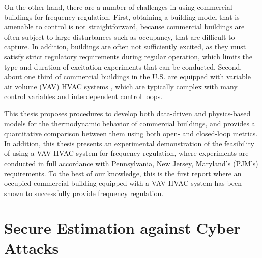 \documentclass[../thesis.tex]{subfiles}
\begin{document}
On the other hand, there are a number of challenges in using commercial buildings for frequency regulation. 
First, obtaining a building model that is amenable to control is not straightforward, because commercial buildings are often subject to large disturbances such as occupancy, that are difficult to capture. 
In addition, buildings are often not sufficiently excited, as they must satisfy strict regulatory requirements during regular operation, which limits the type and duration of excitation experiments that can be conducted.
Second, about one third of commercial buildings in the U.S. are equipped with variable air volume (VAV) HVAC systems \cite{Hao:2012demandresponse}, which are typically complex with many control variables and interdependent control loops.

This thesis proposes procedures to develop both data-driven and physics-based models for the thermodynamic behavior of commercial buildings, and provides a quantitative comparison between them using both open- and closed-loop metrics. 
In addition, this thesis presents an experimental demonstration of the feasibility of using a VAV HVAC system for frequency regulation, where experiments are conducted in full accordance with Pennsylvania, New Jersey, Maryland's (PJM's) requirements. %
To the best of our knowledge, this is the first report where an occupied commercial building equipped with a VAV HVAC system has been shown to successfully provide frequency regulation.






\section{Secure Estimation against Cyber Attacks}
\end{document}
